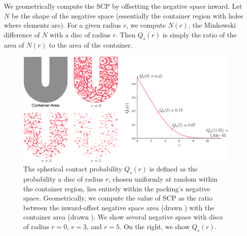 We geometrically compute the SCP by offsetting the negative
space inward.  Let $N$ be the shape of the negative space (essentially
the container region with holes where elements are).  For a given radius
$r$, we compute $N(r)$, the Minkowski difference of $N$ with a disc of
radius $r$.  Then $Q_s(r)$ is simply the ratio of the area of $N(r)$ to
the area of the container.


\begin{figure}[t]
\centering
\includegraphics[width=1.0\textwidth]{figures/metrics/unilever_scp.pdf}
\caption[An illustration of calculating $Q_s(r)$]
{\label{fig_unilever_scp}
\newtext
{
    The spherical contact probability $Q_s(r)$ is defined as the probability 
    a disc of radius $r$, chosen uniformly at random within the container region, lies entirely within the 
	packing's negative space.
	Geometrically, we compute the value of  SCP as the ratio between the inward-offset negative space area (drawn )
	with the container area (drawn ).
	We show several  negative space with discs of radius $r = 0$, $r = 3$, and $r = 5$.
	On the right, we show  $Q_s(r)$.
}
}
\end{figure}

